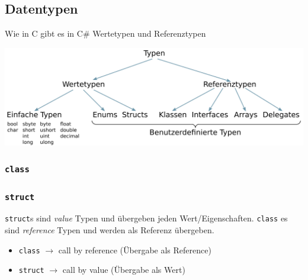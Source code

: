 \documentclass[
  9pt,
  a4paperpaper,
  DIV=11]{scrartcl}
\providecommand{\tightlist}{%
  \setlength{\itemsep}{0pt}\setlength{\parskip}{0pt}}\usepackage{longtable,booktabs,array}
\numberwithin{equation}{section}
\begin{document}
\begin{multicols}{2}
\hypertarget{datentypen}{%
\subsection{Datentypen}\label{datentypen}}

Wie in C gibt es in C\# Wertetypen und Referenztypen

\includegraphics{images/Types.png}

\hypertarget{class}{%
\subsubsection{\texorpdfstring{\texttt{class}}{class}}\label{class}}

\hypertarget{struct}{%
\subsubsection{\texorpdfstring{\texttt{struct}}{struct}}\label{struct}}

\begin{tcolorbox}[enhanced jigsaw, colbacktitle=quarto-callout-tip-color!10!white, colback=white, rightrule=.15mm, title=\textcolor{quarto-callout-tip-color}{\faLightbulb}\hspace{0.5em}{Unterschied \texttt{struct} \& \texttt{class}}, opacityback=0, arc=.35mm, coltitle=black, opacitybacktitle=0.6, breakable, bottomtitle=1mm, toptitle=1mm, colframe=quarto-callout-tip-color-frame, bottomrule=.15mm, titlerule=0mm, left=2mm, leftrule=.75mm, toprule=.15mm]

\texttt{struct}s sind \emph{value} Typen und übergeben jeden
Wert/Eigenschaften. \texttt{class} es sind \emph{reference} Typen und
werden als Referenz übergeben.

\begin{itemize}
\tightlist
\item
  \texttt{class} \(\rightarrow\) call by reference (Übergabe als
  Reference)
\item
  \texttt{struct} \(\rightarrow\) call by value (Übergabe als Wert)
\end{itemize}


\end{tcolorbox}
\end{multicols}
\end{document}
